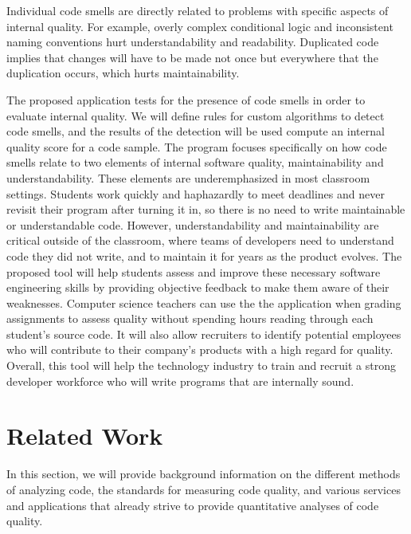 \documentclass{sig-alternate}
\begin{document}
Individual code smells are directly related to problems with specific aspects of internal quality. For example, overly complex conditional logic and inconsistent naming conventions hurt understandability and readability. Duplicated code implies that changes will have to be made not once but everywhere that the duplication occurs, which hurts maintainability. 

The proposed application tests for the presence of code smells in order to evaluate internal quality. We will define rules for custom algorithms to detect code smells, and the results of the detection will be used compute an internal quality score for a code sample. The program focuses specifically on how code smells relate to two elements of internal software quality, maintainability and understandability. These elements are underemphasized in most classroom settings. Students work quickly and haphazardly to meet deadlines and never revisit their program after turning it in, so there is no need to write maintainable or understandable code.  However, understandability and maintainability are critical outside of the classroom, where teams of developers need to understand code they did not write, and to maintain it for years as the product evolves. The proposed tool will help students assess and improve these necessary software engineering skills by providing objective feedback to make them aware of their weaknesses. Computer science teachers can use the the application when grading assignments to assess quality without spending hours reading through each student's source code. It will also allow recruiters to identify potential employees who will contribute to their company's products with a high regard for quality. Overall, this tool will help the technology industry to train and recruit a strong developer workforce who will write programs that are internally sound. 

\section{Related Work}
\label{sec:related_work}
In this section, we will provide background information on the different methods of analyzing code, the standards for measuring code quality, and various services and applications that already strive to provide quantitative analyses of code quality.
\end{document}
